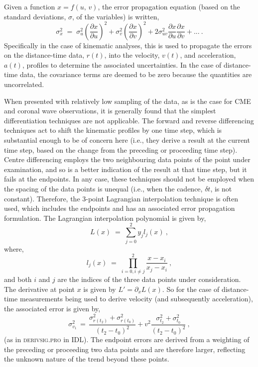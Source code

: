 \documentclass[referee]{aa}
\begin{document}
Given a function $x=f(u,\,v)$, the error propagation equation (based on the standard deviations, $\sigma$, of the variables) is written,
\begin{equation}
\label{eqn_errorprop}
\sigma_x^2 \; = \; \sigma_u^2 \left(\frac{\partial x}{\partial u}\right) ^2 + \sigma_v^2 \left( \frac{\partial x}{\partial v} \right) ^2 + 2 \sigma_{uv}^2 \frac{\partial x}{\partial u} \frac{\partial x}{\partial v} + ...\ .
\end{equation}
Specifically in the case of kinematic analyses, this is used to propagate the errors on the distance-time data, $r(t)$, into the velocity, $v(t)$, and acceleration, $a(t)$, profiles to determine the associated uncertainties. In the case of distance-time data, the covariance terms are deemed to be zero because the quantities are uncorrelated.

When presented with relatively low sampling of the data, as is the case for CME and coronal wave observations, it is generally found that the simplest differentiation techniques are not applicable. The forward and reverse differencing techniques act to shift the kinematic profiles by one time step, which is substantial enough to be of concern here (i.e., they derive a result at the current time step, based on the change from the preceding or proceeding time step). Centre differencing employs the two neighbouring data points of the point under examination, and so is a better indication of the result at that time step, but it fails at the endpoints. In any case, these techniques should not be employed when the spacing of the data points is unequal (i.e., when the cadence, $\delta t$, is not constant). Therefore, the 3-point Lagrangian interpolation technique is often used, which includes the endpoints and has an associated error propagation formulation. The Lagrangian interpolation polynomial is given by,
\begin{equation}
L(x) \; =\; \sum_{j=0}^2 y_j l_j(x)\ ,
\end{equation}
where,
\begin{equation}
l_j(x) \; =\; \prod_{i=0, i\neq j}^2 \frac{x-x_i}{x_j-x_i} \ ,
\end{equation}
and both $i$ and $j$ are the indices of the three data points under consideration. The derivative at point $x$ is given by $L'=\partial_x L(x)$. So for the case of distance-time measurements being used to derive velocity (and subsequently acceleration), the associated error is given by,
\begin{equation}
\sigma_{v_1}^2 \,=\, \frac{\sigma_{r(t_2)}^2+\sigma_{r(t_0)}^2}{(t_2-t_0)^2} + v^2 \frac{\sigma_{t_2}^2+\sigma_{t_0}^2}{(t_2-t_0)^2}\ ,
\label{vel_err}
\end{equation}
(as in \textsc{derivsig.pro} in IDL). The endpoint errors are derived from a weighting of the preceding or proceeding two data points and are therefore larger, reflecting the unknown nature of the trend beyond these points.
\end{document}

